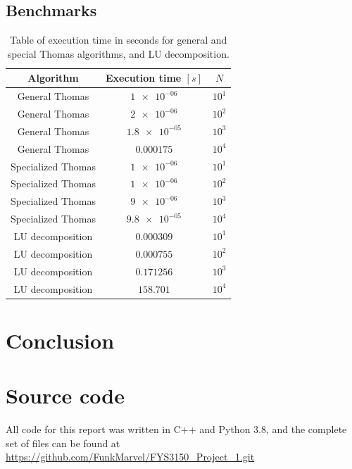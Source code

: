 \documentclass[english,notitlepage,reprint]{revtex4-1}  %
\begin{document}
\subsection{Benchmarks} \label{subsec:IV:C}
\begin{table}[H]
	\centering
	\label{table:iv:c:1}
	\begin{tabular}{|c|c|c|}
		Algorithm & Execution time \([s]\) & \(N\) \\\hline
		General Thomas & \(\num{1e-06}\) & \(10^{1}\) \\
		General Thomas & \(\num{2e-06}\) & \(10^{2}\) \\
		General Thomas & \(\num{1.8e-05}\) & \(10^{3}\) \\
		General Thomas & \(\num{0.000175}\) & \(10^{4}\) \\\hline
		Specialized Thomas & \(\num{1e-06}\) & \(10^{1}\) \\
		Specialized Thomas & \(\num{1e-06}\) & \(10^{2}\) \\
		Specialized Thomas & \(\num{9e-06}\) & \(10^{3}\) \\
		Specialized Thomas & \(\num{9.8e-05}\) & \(10^{4}\) \\\hline
		LU decomposition & \(\num{0.000309}\) & \(10^{1}\) \\
		LU decomposition & \(\num{0.000755}\) & \(10^{2}\) \\
		LU decomposition & \(\num{0.171256}\) & \(10^{3}\) \\
		LU decomposition & \(\num{158.701}\) & \(10^{4}\)
	\end{tabular}
	\caption{Table of execution time in seconds for general and special Thomas algorithms, and LU decomposition.}
\end{table}

\section{Conclusion} \label{sec:V}

{}

\appendix
\section{Source code}
All code for this report was written in C++ and Python 3.8, and the complete set of files can be found at \url{https://github.com/FunkMarvel/FYS3150_Project_1.git}
\end{document}
